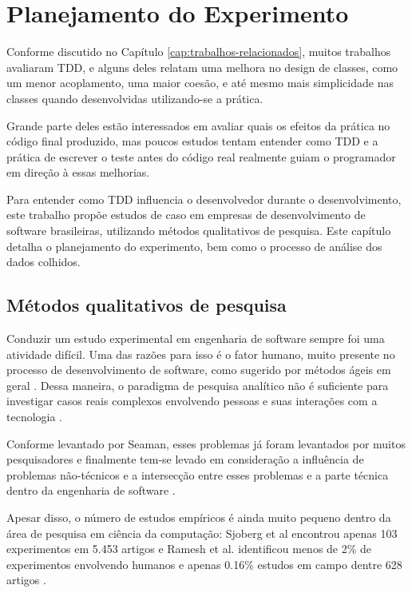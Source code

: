 \chapter{Planejamento do Experimento}
\label{cap:planejamento}

Conforme discutido no Capítulo \ref{cap:trabalhos-relacionados}, muitos 
trabalhos avaliaram TDD, e alguns deles relatam uma melhora
no design de classes, como um menor acoplamento, uma maior coesão, e até mesmo
mais simplicidade nas classes quando desenvolvidas utilizando-se a prática. 

Grande parte deles estão interessados em avaliar quais os efeitos da prática
no código final produzido, mas poucos estudos tentam entender como TDD e a
prática de escrever o teste antes do código real realmente guiam o programador 
em direção à essas melhorias.

Para entender como TDD influencia o desenvolvedor durante o desenvolvimento,
este trabalho propõe estudos de caso em empresas de desenvolvimento de
software brasileiras, utilizando métodos qualitativos de pesquisa.
Este capítulo detalha o planejamento do experimento, bem como o processo de
análise dos dados colhidos.

\section{Métodos qualitativos de pesquisa} 
\label{sec:planejamento-qualitativa}

Conduzir um estudo experimental em engenharia de software sempre foi uma
atividade difícil. Uma das razões para isso é o fator humano, muito presente 
no processo de desenvolvimento de software, como sugerido por métodos ágeis  em
geral \cite{AgileManifesto}. Dessa maneira, o paradigma de pesquisa analítico 
não é suficiente para investigar casos reais complexos envolvendo pessoas e 
suas interações com a tecnologia \cite{guidelines-case-study}.

Conforme levantado por Seaman, esses problemas já foram levantados por muitos
pesquisadores e finalmente tem-se levado em consideração a influência de
problemas não-técnicos e a intersecção entre esses problemas e a parte técnica
dentro da engenharia de software \cite{seaman}. 

Apesar disso, o número de estudos empíricos é ainda muito pequeno dentro da área
de pesquisa em ciência da computação: Sjoberg et al encontrou apenas 103
experimentos em 5.453 artigos \cite{sjoberg} e Ramesh et al. identificou menos
de 2\% de experimentos envolvendo humanos e apenas 0.16\% estudos em campo 
dentre 628 artigos \cite{ramesh} .

